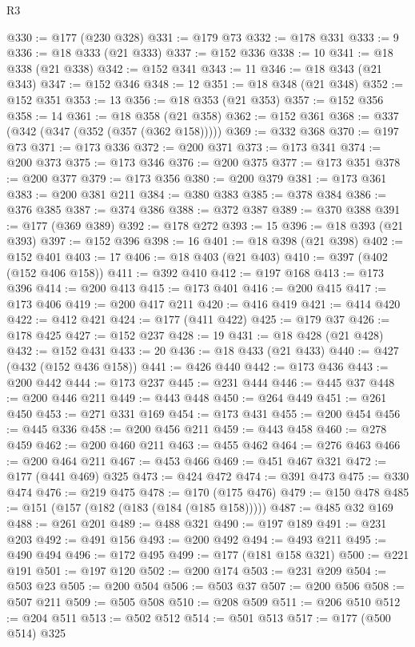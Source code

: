 \begin{lexlean}{R3}
\begin{coremodule}
@330 := @177 (@230 @328)
@331 := @179 @73
@332 := @178 @331
@333 := 9
@336 := @18 @333 (@21 @333)
@337 := @152 @336
@338 := 10
@341 := @18 @338 (@21 @338)
@342 := @152 @341
@343 := 11
@346 := @18 @343 (@21 @343)
@347 := @152 @346
@348 := 12
@351 := @18 @348 (@21 @348)
@352 := @152 @351
@353 := 13
@356 := @18 @353 (@21 @353)
@357 := @152 @356
@358 := 14
@361 := @18 @358 (@21 @358)
@362 := @152 @361
@368 := @337 (@342 (@347 (@352 (@357 (@362 @158)))))
@369 := @332 @368
@370 := @197 @73
@371 := @173 @336
@372 := @200 @371
@373 := @173 @341
@374 := @200 @373
@375 := @173 @346
@376 := @200 @375
@377 := @173 @351
@378 := @200 @377
@379 := @173 @356
@380 := @200 @379
@381 := @173 @361
@383 := @200 @381 @211
@384 := @380 @383
@385 := @378 @384
@386 := @376 @385
@387 := @374 @386
@388 := @372 @387
@389 := @370 @388
@391 := @177 (@369 @389)
@392 := @178 @272
@393 := 15
@396 := @18 @393 (@21 @393)
@397 := @152 @396
@398 := 16
@401 := @18 @398 (@21 @398)
@402 := @152 @401
@403 := 17
@406 := @18 @403 (@21 @403)
@410 := @397 (@402 (@152 @406 @158))
@411 := @392 @410
@412 := @197 @168
@413 := @173 @396
@414 := @200 @413
@415 := @173 @401
@416 := @200 @415
@417 := @173 @406
@419 := @200 @417 @211
@420 := @416 @419
@421 := @414 @420
@422 := @412 @421
@424 := @177 (@411 @422)
@425 := @179 @37
@426 := @178 @425
@427 := @152 @237
@428 := 19
@431 := @18 @428 (@21 @428)
@432 := @152 @431
@433 := 20
@436 := @18 @433 (@21 @433)
@440 := @427 (@432 (@152 @436 @158))
@441 := @426 @440
@442 := @173 @436
@443 := @200 @442
@444 := @173 @237
@445 := @231 @444
@446 := @445 @37
@448 := @200 @446 @211
@449 := @443 @448
@450 := @264 @449
@451 := @261 @450
@453 := @271 @331 @169
@454 := @173 @431
@455 := @200 @454
@456 := @445 @336
@458 := @200 @456 @211
@459 := @443 @458
@460 := @278 @459
@462 := @200 @460 @211
@463 := @455 @462
@464 := @276 @463
@466 := @200 @464 @211
@467 := @453 @466
@469 := @451 @467 @321
@472 := @177 (@441 @469) @325
@473 := @424 @472
@474 := @391 @473
@475 := @330 @474
@476 := @219 @475
@478 := @170 (@175 @476)
@479 := @150 @478
@485 := @151 (@157 (@182 (@183 (@184 (@185 @158)))))
@487 := @485 @32 @169
@488 := @261 @201
@489 := @488 @321
@490 := @197 @189
@491 := @231 @203
@492 := @491 @156
@493 := @200 @492
@494 := @493 @211
@495 := @490 @494
@496 := @172 @495
@499 := @177 (@181 @158 @321)
@500 := @221 @191
@501 := @197 @120
@502 := @200 @174
@503 := @231 @209
@504 := @503 @23
@505 := @200 @504
@506 := @503 @37
@507 := @200 @506
@508 := @507 @211
@509 := @505 @508
@510 := @208 @509
@511 := @206 @510
@512 := @204 @511
@513 := @502 @512
@514 := @501 @513
@517 := @177 (@500 @514) @325

\end{coremodule}
\end{lexlean}
